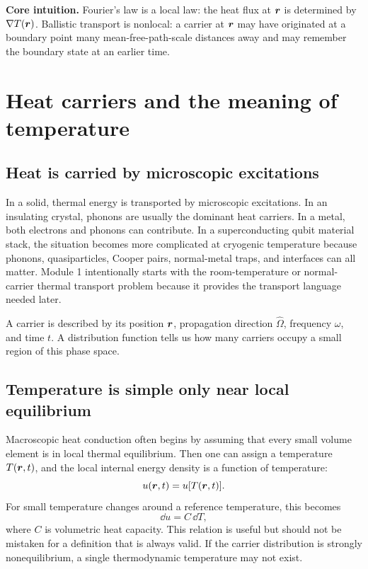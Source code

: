 \documentclass[11pt]{article}
\begin{document}
\begin{physicsbox}
\textbf{Core intuition.} Fourier's law is a local law: the heat flux at \(\bm{r}\) is determined by \(\nabla T(\bm{r})\). Ballistic transport is nonlocal: a carrier at \(\bm{r}\) may have originated at a boundary point many mean-free-path-scale distances away and may remember the boundary state at an earlier time.
\end{physicsbox}

\section{Heat carriers and the meaning of temperature}
\subsection{Heat is carried by microscopic excitations}
In a solid, thermal energy is transported by microscopic excitations. In an insulating crystal, phonons are usually the dominant heat carriers. In a metal, both electrons and phonons can contribute. In a superconducting qubit material stack, the situation becomes more complicated at cryogenic temperature because phonons, quasiparticles, Cooper pairs, normal-metal traps, and interfaces can all matter. Module 1 intentionally starts with the room-temperature or normal-carrier thermal transport problem because it provides the transport language needed later.

A carrier is described by its position \(\bm{r}\), propagation direction \(\hat{\Omega}\), frequency \(\omega\), and time \(t\). A distribution function tells us how many carriers occupy a small region of this phase space.

\subsection{Temperature is simple only near local equilibrium}
Macroscopic heat conduction often begins by assuming that every small volume element is in local thermal equilibrium. Then one can assign a temperature \(T(\bm{r},t)\), and the local internal energy density is a function of temperature:
\begin{equation}
    u(\bm{r},t)=u[T(\bm{r},t)].
\end{equation}
For small temperature changes around a reference temperature, this becomes
\begin{equation}
    \dd u = C\,\dd T,
\end{equation}
where \(C\) is volumetric heat capacity. This relation is useful but should not be mistaken for a definition that is always valid. If the carrier distribution is strongly nonequilibrium, a single thermodynamic temperature may not exist.
\end{document}
